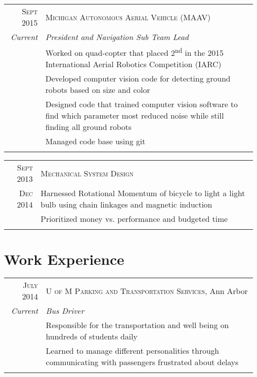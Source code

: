\documentclass[a4paper,10pt]{article} %
\begin{document}
\begin{tabular}{r|p{13cm}}
\textsc{Sept 2015} & \textsc{Michigan Autonomous Aerial Vehicle (MAAV)} \\
\emph{Current} & \emph{President and Navigation Sub Team Lead} \\
& \footnotesize{Worked on quad-copter that placed 2\textsuperscript{nd} in the 2015 International Aerial Robotics Competition (IARC)} \\
& \footnotesize{Developed computer vision code for detecting ground robots based on size and color} \\
& \footnotesize{Designed code that trained computer vision software to find which parameter most reduced noise while still finding all ground robots} \\
& \footnotesize{Managed code base using git} \\
\multicolumn{2}{c}{} \\
\end{tabular}


\begin{tabular}{r|p{13cm}}
\textsc{Sept 2013} & \textsc{Mechanical System Design} \\
\textsc{Dec 2014} & \footnotesize{Harnessed Rotational Momentum of bicycle to light a light bulb using chain linkages and magnetic induction} \\
& \footnotesize{Prioritized money vs. performance and budgeted time} \\
\multicolumn{2}{c}{} \\
\end{tabular}


\section{Work Experience}

\begin{tabular}{r|p{13cm}}
\textsc{July 2014} & \textsc{U of M Parking and Transportation Services}, Ann Arbor \\
\emph{Current} & \emph{Bus Driver} \\
& \footnotesize{Responsible for the transportation and well being on hundreds of students daily} \\
& \footnotesize{Learned to manage different personalities through communicating with passengers frustrated about delays} \\
\multicolumn{2}{c}{} \\
\end{tabular}
\end{document}
